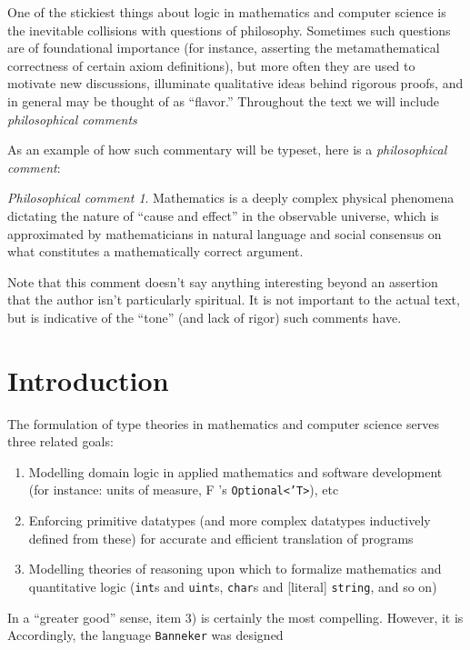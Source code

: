 \documentclass{amsbook}
\DeclareRobustCommand{\#}{\adjustbox{valign=B,totalheight=.57\baselineskip}{\oldhash}}%
\theoremstyle{definition}
\theoremstyle{remark}
\newtheorem{philcomment}[theorem]{Philosophical comment}
\numberwithin{section}{chapter}
\numberwithin{equation}{chapter}
\begin{document}
One of the stickiest things about logic in mathematics and computer science is the inevitable collisions with questions of philosophy. Sometimes such questions are of foundational importance (for instance, asserting the metamathematical correctness of certain axiom definitions), but more often they are used to motivate new discussions, illuminate qualitative ideas behind rigorous proofs, and in general may be thought of as ``flavor.'' Throughout the text we will include \emph{philosophical comments}

As an example of how such commentary will be typeset, here is a \emph{philosophical comment}:

\begin{philcomment}
    Mathematics is a deeply complex physical phenomena dictating the nature of ``cause and effect'' in the observable universe, which is approximated by mathematicians in natural language and social consensus on what constitutes a mathematically correct argument.
\end{philcomment}

Note that this comment doesn't say anything interesting beyond an assertion that the author isn't particularly spiritual. It is not important to the actual text, but is indicative of the ``tone'' (and lack of rigor) such comments have. 

\chapter{Introduction}

The formulation of type theories in mathematics and computer science serves three related goals:

\begin{enumerate}
    \item Modelling domain logic in applied mathematics and software development (for instance: units of measure, F \#'s \texttt{Optional<'T>}), etc
    \item Enforcing primitive datatypes (and more complex datatypes inductively defined from these) for accurate and efficient translation of programs 
    \item Modelling theories of reasoning upon which to formalize mathematics and quantitative logic (\texttt{int}s and \texttt{uint}s, \texttt{char}s and [literal] \texttt{string}, and so on)
\end{enumerate}

In a ``greater good'' sense, item 3) is certainly the most compelling. However, it is Accordingly, the language \texttt{Banneker} was designed 
\end{document}
